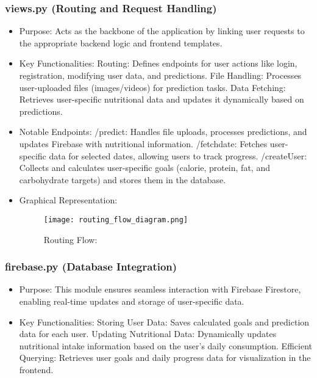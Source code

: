 \documentclass[conference]{IEEEtran}
\begin{document}
\subsubsection{views.py (Routing and Request Handling)}  
\begin{itemize}
    \item Purpose: Acts as the backbone of the application by linking user requests to the appropriate backend logic and frontend templates.\newline
    \item Key Functionalities: \newline
           Routing: Defines endpoints for user actions like login, registration, modifying user data, and predictions.\newline
           File Handling: Processes user-uploaded files (images/videos) for prediction tasks.\newline
           Data Fetching: Retrieves user-specific nutritional data and updates it dynamically based on predictions.\newline
    \item Notable Endpoints:\newline
            /predict: Handles file uploads, processes predictions, and updates Firebase with nutritional information.\newline
            /fetchdate: Fetches user-specific data for selected dates, allowing users to track progress.\newline
            /createUser: Collects and calculates user-specific goals (calorie, protein, fat, and carbohydrate targets) and stores them in the database.\newline
    \item Graphical Representation: \newline
    \begin{figure}[H]
        \centering
        \texttt{[image: routing\_flow\_diagram.png]}
        \caption{Routing Flow:}
        \label{fig:enter-label}
    \end{figure}
\end{itemize}
\subsubsection{firebase.py (Database Integration)}
\begin{itemize}
    \item Purpose: This module ensures seamless interaction with Firebase Firestore, enabling real-time updates and storage of user-specific data.\newline
    \item Key Functionalities:\newline
         Storing User Data: Saves calculated goals and prediction data for each user.\newline
         Updating Nutritional Data: Dynamically updates nutritional intake information based on the user's daily consumption.\newline
         Efficient Querying: Retrieves user goals and daily progress data for visualization in the frontend.\newline
\end{itemize}
\end{document}

